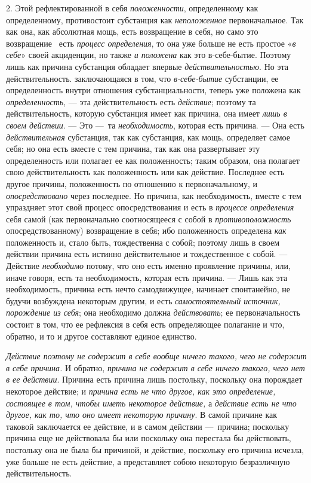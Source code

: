 2. Этой рефлектированной в себя {\em положенности},
определенному как определенному, противостоит субстанция как
{\em неположенное} первоначальное. Так как она, как
абсолютная мощь, есть возвращение в себя, но само это возвращение \ есть
{\em процесс определения}, то она уже больше не есть
простое «{\em в себе}» своей акциденции, но также
{\em и положена} как это в-себе-бытие. Поэтому лишь как
причина субстанция обладает впервые
{\em действительностью}. Но эта действительность.
заключающаяся в том, что {\em в-себе-бытие} субстанции,
ее определенность внутри отношения субстанциальности, теперь уже положена
как {\em определенность}, — эта действительность есть
{\em действие}; поэтому та действительность, которую
субстанция имеет как причина, она имеет {\em лишь в
своем действии}. — Это —~та {\em необходимость},
которая есть причина. — Она есть {\em действительная}
субстанция, так как субстанция, как мощь, определяет самое себя; но она
есть вместе с тем причина, так как она развертывает эту определенность или
полагает ее как положенность; таким образом, она полагает свою
действительность как положенность или как действие. Последнее есть другое
причины, положенность по отношению к первоначальному, и
{\em опосредствовано} через последнее. Но причина, как
необходимость, вместе с тем упраздняет этот свой процесс опосредствования и
есть в {\em процессе определения} себя самой (как
первоначально соотносящееся с собой в
{\em противоположность} опосредствованному) возвращение
в себя; ибо положенность определена {\em как}
положенность и, стало быть, тождественна с собой; поэтому лишь в своем
действии причина есть истинно действительное и тождественное с собой. —
Действие {\em необходимо} потому, что оно есть именно
проявление причины, или, иначе говоря, есть та необходимость, которая есть
причина. — Лишь как эта необходимость, причина есть нечто самодвижущее,
начинает спонтанейно, не будучи возбуждена некоторым другим, и есть
{\em самостоятельный источник, порождение из себя}; она
необходимо должна {\em действовать}; ее
первоначальность состоит в том, что ее рефлексия в себя есть определяющее
полагание и что, обратно, и то и другое составляют единое единство.

{\em Действие поэтому не содержит в себе вообще ничего
такого, чего не содержит в себе причина.} И обратно,
{\em причина не содержит в себе ничего такого, чего нет
в ее действии}. Причина есть причина лишь постольку, поскольку она
порождает некоторое действие; и {\em причина есть не
что другое, как это определение, состоящее в том, чтобы иметь некоторое
действие, }а {\em действие есть не что другое, как то,
что оно имеет некоторую причину}. В самой причине как таковой заключается
ее действие, и в самом действии —~причина; поскольку причина еще не
действовала бы или поскольку она перестала бы действовать, постольку она не
была бы причиной, и действие, поскольку его причина исчезла, уже больше не
есть действие, а представляет собою некоторую безразличную
действительность.

